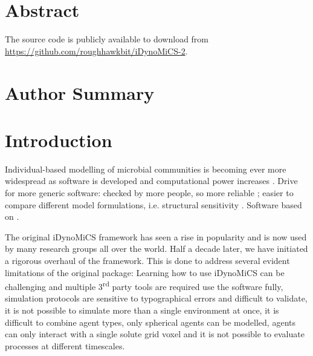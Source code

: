 \documentclass[10pt,letterpaper]{article}
\begin{document}
\section*{Abstract}


The source code is publicly available to download from \url{https://github.com/roughhawkbit/iDynoMiCS-2}.

\section*{Author Summary}

\linenumbers

\section*{Introduction}
Individual-based modelling of microbial communities is becoming ever more widespread as software is developed and computational power increases \cite{Ferrer2008}.
Drive for more generic software:
checked by more people, so more reliable \cite{Joppa2013};
easier to compare different model formulations, i.e. structural sensitivity  \cite{Adamson2013}.
Software based on \cite{Kreft1998, Lardon2011, Storck2014}. 


The original iDynoMiCS framework \cite{Lardon2011} has seen a rise in popularity and is now used by many research groups all over the world. Half a decade later, we have initiated a rigorous overhaul of the framework. This is done to address several evident limitations of the original package: Learning how to use iDynoMiCS can be challenging and multiple 3\textsuperscript{rd} party tools are required use the software fully, simulation protocols are sensitive to typographical errors and difficult to validate, it is not possible to simulate more than a single environment at once, it is difficult to combine agent types, only spherical agents can be modelled, agents can only interact with a single solute grid voxel and it is not possible to evaluate processes at different timescales.
\end{document}
